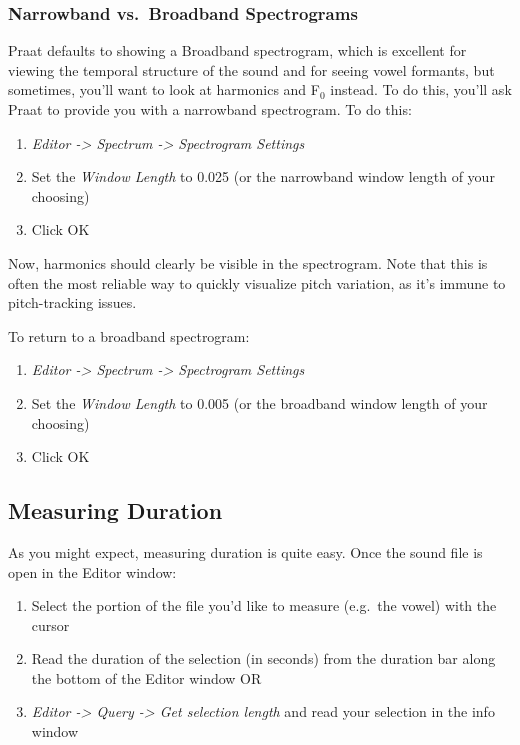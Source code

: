 \documentclass[11pt]{article}
\def\tightlist{}
\begin{document}
\hypertarget{narrowband-vs.-broadband-spectrograms}{%
\subsubsection{Narrowband vs.~Broadband
Spectrograms}\label{narrowband-vs.-broadband-spectrograms}}

\label{subsec:broadnarrow} Praat defaults to showing a Broadband
spectrogram, which is excellent for viewing the temporal structure of
the sound and for seeing vowel formants, but sometimes, you'll want to
look at harmonics and F$_{0}$ instead. To do this, you'll ask Praat to
provide you with a narrowband spectrogram. To do this:

\begin{enumerate}
\def\labelenumi{\arabic{enumi}.}
\tightlist
\item
  \emph{Editor -\textgreater{} Spectrum -\textgreater{} Spectrogram
  Settings}
\item
  Set the \emph{Window Length} to 0.025 (or the narrowband window length
  of your choosing)
\item
  Click OK
\end{enumerate}

Now, harmonics should clearly be visible in the spectrogram. Note that
this is often the most reliable way to quickly visualize pitch
variation, as it's immune to pitch-tracking issues.

To return to a broadband spectrogram:

\begin{enumerate}
\def\labelenumi{\arabic{enumi}.}
\tightlist
\item
  \emph{Editor -\textgreater{} Spectrum -\textgreater{} Spectrogram
  Settings}
\item
  Set the \emph{Window Length} to 0.005 (or the broadband window length
  of your choosing)
\item
  Click OK
\end{enumerate}

\hypertarget{measuring-duration}{%
\subsection{Measuring Duration}\label{measuring-duration}}

As you might expect, measuring duration is quite easy. Once the sound
file is open in the Editor window:

\begin{enumerate}
\def\labelenumi{\arabic{enumi}.}
\tightlist
\item
  Select the portion of the file you'd like to measure (e.g.~the vowel)
  with the cursor
\item
  Read the duration of the selection (in seconds) from the duration bar
  along the bottom of the Editor window OR
\item
  \emph{Editor -\textgreater{} Query -\textgreater{} Get selection
  length} and read your selection in the info window
\end{enumerate}
\end{document}
